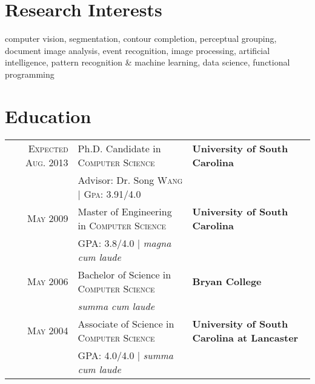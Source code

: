 \documentclass[10pt]{article}
\begin{document}
\section{Research Interests}

computer vision, segmentation, contour completion, perceptual
grouping, document image analysis, event recognition, image
processing, artificial intelligence, pattern recognition \& machine
learning, data science, functional programming

\section{Education}
\begin{tabularx}{\linewidth}{@{}r l X}
  \textsc{Expected Aug. 2013} & Ph.D. Candidate in \textsc{Computer Science} & \textbf{University of South Carolina}\\
  &%
  \small Advisor: Dr. Song \textsc{Wang} | \normalsize \textsc{Gpa}: 3.91/4.0 &
  \\ [1ex]%
  \textsc{May} 2009 & Master of Engineering in \textsc{Computer Science} & \textbf{University of South Carolina}\\
  &\normalsize \textsc{GPA}: 3.8/4.0 | \small\emph{magna cum laude}
\\[1ex]%
\textsc{May} 2006& Bachelor of Science in \textsc{Computer Science} & \textbf{Bryan College} \\
&\normalsize 
\small\emph{summa cum laude}
\\[1ex]%
\textsc{May} 2004& Associate of Science in \textsc{Computer Science} & \small{\textbf{University of South Carolina at Lancaster}} \\
&\normalsize \textsc{GPA}: 4.0/4.0 | \small\emph{summa cum laude} &\\
\end{tabularx}

\newcommand{\experience}[4]{
\textsc{#1} & #2 \\
\nopagebreak &\emph{#3}\\
\nopagebreak &\footnotesize{#4} \\
\nopagebreak \multicolumn{2}{c}{} \\ [-1ex]
}
\end{document}
